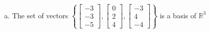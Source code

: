 \begin{exerciseAnswer}
\begin{enumerate}[(a)]
\item The set of vectors \( \left\{ \left[\begin{array}{c}
-3 \\
-3 \\
-5
\end{array}\right] , \left[\begin{array}{c}
0 \\
2 \\
4
\end{array}\right] , \left[\begin{array}{c}
-3 \\
4 \\
-4
\end{array}\right] \right\} \) is a basis of \(\mathbb{R}^3\)
\end{enumerate}
    
\end{exerciseAnswer}
    
